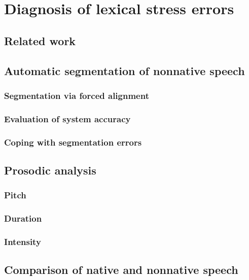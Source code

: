 %
%
\chapter{Diagnosis of lexical stress errors}
\label{chap:diagnosis}


\blindtext 

\section{Related work}

\section{Automatic segmentation of nonnative speech}
	\subsection{Segmentation via forced alignment}
	\subsection{Evaluation of system accuracy}
	\subsection{Coping with segmentation errors}
	
\section{Prosodic analysis}
	\subsection{Pitch}
	\subsection{Duration}
	\subsection{Intensity}
	
\section{Comparison of native and nonnative speech}
